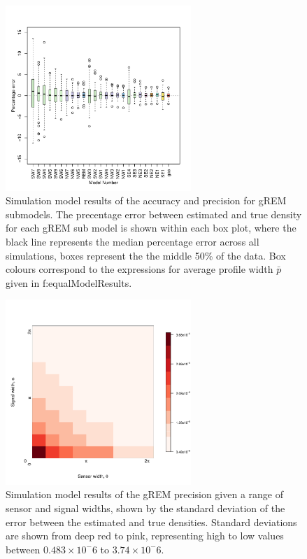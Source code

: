 \documentclass[a4paper,10pt,reqno,oneside]{amsart}
\begin{document}
\begin{figure}[t]
	\centering
	\includegraphics[width=7cm]{imgs/AverageModelBias.pdf}
       	\caption{Simulation model results of the accuracy and precision for gREM submodels. The precentage error between estimated and true density for each gREM sub model is shown within each box plot, where the black line represents the median percentage error across all simulations, boxes represent the the middle 50\% of the data. Box colours correspond to the expressions for average profile width $\bar{p}$ given in {f:equalModelResults}.        
} 
	\label{f:ModelBias}
\end{figure}
	
\begin{figure}[t]
	\includegraphics[width=7cm]{imgs/ResultStandardDeviation.pdf}
	\caption{Simulation model results of the gREM precision given a range of sensor and signal widths, shown by the standard deviation of the error between the estimated and true densities. Standard deviations are shown from deep red to pink, representing high to low values between $0.483\times10^-6$ to $3.74\times10^-6$. 
        } 
	\label{f:StandardDevaition}
\end{figure}
\end{document}
